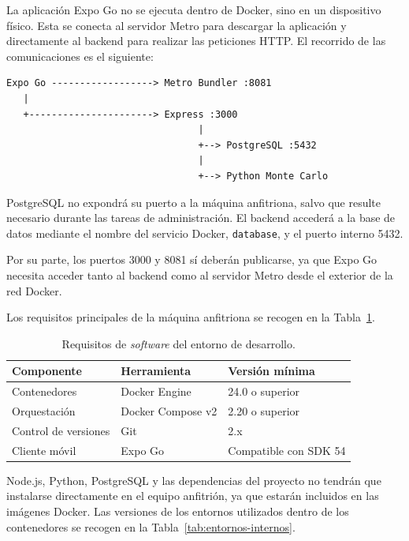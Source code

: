 La aplicaci\'on Expo Go no se ejecuta dentro de Docker, sino en un dispositivo
f\'isico. Esta se conecta al servidor Metro para descargar la aplicaci\'on
y directamente al backend para realizar las peticiones HTTP. El recorrido de las
comunicaciones es el siguiente:

\begin{lstlisting}
Expo Go ------------------> Metro Bundler :8081
   |
   +----------------------> Express :3000
                                  |
                                  +--> PostgreSQL :5432
                                  |
                                  +--> Python Monte Carlo
\end{lstlisting}

PostgreSQL no expondr\'a su puerto a la m\'aquina anfitriona, salvo que resulte
necesario durante las tareas de administraci\'on. El backend acceder\'a a la base de
datos mediante el nombre del servicio Docker, \texttt{database}, y el puerto
interno 5432.

Por su parte, los puertos 3000 y 8081 s\'i deber\'an publicarse, ya que Expo Go
necesita acceder tanto al backend como al servidor Metro desde el exterior de la
red Docker.

Los requisitos principales de la m\'aquina anfitriona se recogen en la
Tabla~\ref{tab:requisitos-host}.

\begin{table}[H]
\centering
\caption{Requisitos de \textit{software} del entorno de desarrollo.}
\label{tab:requisitos-host}
\begin{tabular}{|p{3.4cm}|p{5cm}|p{4.6cm}|}
\hline
\textbf{Componente} & \textbf{Herramienta} & \textbf{Versi\'on m\'inima} \\
\hline
Contenedores & Docker Engine & 24.0 o superior \\
\hline
Orquestaci\'on & Docker Compose v2 & 2.20 o superior \\
\hline
Control de versiones & Git & 2.x \\
\hline
Cliente m\'ovil & Expo Go & Compatible con SDK 54 \\
\hline
\end{tabular}
\end{table}

Node.js, Python, PostgreSQL y las dependencias del proyecto no tendr\'an que
instalarse directamente en el equipo anfitri\'on, ya que estar\'an incluidos en
las im\'agenes Docker. Las versiones de los entornos utilizados dentro de los
contenedores se recogen en la Tabla~\ref{tab:entornos-internos}.


